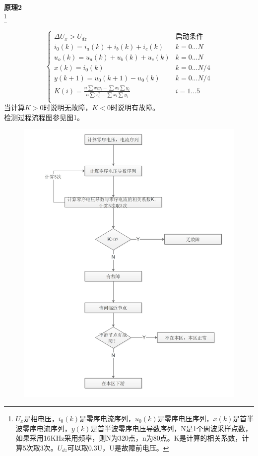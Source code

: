 \documentclass{article}
\begin{document}
\begin{CJK}{UTF8}{gbsn}
	\textbf{原理2}\\
	\footnote{$U_x$是相电压，$i_0(k)$是零序电流序列，$u_0(k)$是零序电压序列，$x(k)$是首半波零序电流序列，$y(k)$是首半波零序电压导数序列，N是1个周波采样点数，如果采用16KHz采用频率，则N为320点，n为80点。K是计算的相关系数，计算5次取3次。$U_{dz}$可以取0.3U，U是故障前电压。}
	\par
		$$
			\left\{	
				\begin{array}{ll}
				\Delta U_x>U_{dz} & \textrm{启动条件}\\
				i_0(k)=i_a(k) + i_b(k) + i_c(k) & k=0...N \\
				u_o(k)=u_a(k)+u_b(k)+u_c(k) & k=0...N \\
				x(k)=i_0(k) & k=0...N/4 \\
				y(k+1)=u_0(k+1)-u_0(k) & k=0...N/4 \\
				K(i)=\frac{n\sum{x_i y_i}-\sum x_i\sum y_i}{n\sum x_i^2 - \sum x_i \sum y_i} & i=1...5\\
				\end{array}
			\right.
		$$
		当计算$K>0$时说明无故障，$K<0$时说明有故障。\\
		检测过程流程图参见图1。\\
		\begin{figure}[H]
		\centering
		\includegraphics[scale=0.4]{figure1.jpg}

\end{figure}
\end{CJK}
\end{document}
